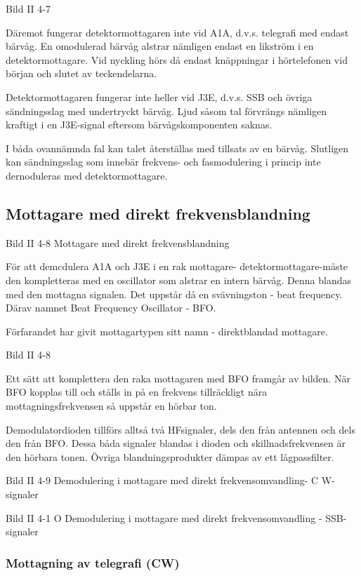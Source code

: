 Bild II 4-7

Däremot fungerar detektormottagaren inte vid A1A, d.v.s. telegrafi med
endast bärvåg. En omodulerad bärvåg alstrar nämligen endast en
likström i en detektormottagare. Vid nyckling hörs då endast
knäppningar i hörtelefonen vid början och slutet av teckendelarna.

Detektormottagaren fungerar inte heller vid J3E, d.v.s. SSB och övriga
sändningsslag med undertryckt bärvåg. Ljud såsom tal förvrängs
nämligen kraftigt i en J3E-signal eftersom bärvågskomponenten saknas.

I båda ovannämnda fal kan talet återställas med tillsats av en bärvåg.
Slutligen kan sändningsslag som innebär frekvens- och fasmodulering i
princip inte dernoduleras med detektormottagare.

\subsection{Mottagare med direkt frekvensblandning}

Bild II 4-8 Mottagare med direkt frekvensblandning

För att demcdulera A1A och J3E i en rak mottagare-
detektormottagare-måste den kompletteras med en oscillator som alstrar
en intern bärvåg. Denna blandas med den mottagna signalen. Det uppstår
då en svävningston - beat frequency. Därav namnet Beat Frequency
Oscillator - BFO.

Förfarandet har givit mottagartypen sitt namn - direktblandad
mottagare.

Bild II 4-8

Ett sätt att komplettera den raka mottagaren med BFO framgår av
bilden. När BFO kopplas till och ställs in på en frekvens tillräckligt
nära mottagningsfrekvensen så uppstår en hörbar ton.

Demodulatordioden tillförs alltså två HFsignaler, dels den från
antennen och dels den från BFO. Dessa båda signaler blandas i dioden
och skillnadsfrekvensen är den hörbara tonen. Övriga
blandningsprodukter dämpas av ett lågpassfilter.

Bild II 4-9 Demodulering i mottagare med direkt frekvensomvandling- C W-signaler

Bild II 4-1 O Demodulering i mottagare med direkt frekvensomvandling - SSB-signaler

\subsubsection{Mottagning av telegrafi (CW)}

